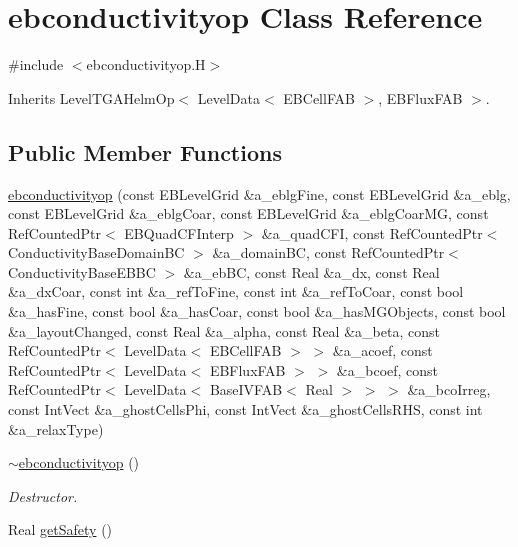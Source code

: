 \hypertarget{classebconductivityop}{}\section{ebconductivityop Class Reference}
\label{classebconductivityop}


{\ttfamily \#include $<$ebconductivityop.\+H$>$}



Inherits Level\+T\+G\+A\+Helm\+Op$<$ Level\+Data$<$ E\+B\+Cell\+F\+A\+B $>$, E\+B\+Flux\+F\+A\+B $>$.

\subsection*{Public Member Functions}
\begin{DoxyCompactItemize}
\item 
\hyperlink{classebconductivityop_a50a0d77b64d8a917c4fd860137751110}{ebconductivityop} (const E\+B\+Level\+Grid \&a\+\_\+eblg\+Fine, const E\+B\+Level\+Grid \&a\+\_\+eblg, const E\+B\+Level\+Grid \&a\+\_\+eblg\+Coar, const E\+B\+Level\+Grid \&a\+\_\+eblg\+Coar\+MG, const Ref\+Counted\+Ptr$<$ E\+B\+Quad\+C\+F\+Interp $>$ \&a\+\_\+quad\+C\+FI, const Ref\+Counted\+Ptr$<$ Conductivity\+Base\+Domain\+BC $>$ \&a\+\_\+domain\+BC, const Ref\+Counted\+Ptr$<$ Conductivity\+Base\+E\+B\+BC $>$ \&a\+\_\+eb\+BC, const Real \&a\+\_\+dx, const Real \&a\+\_\+dx\+Coar, const int \&a\+\_\+ref\+To\+Fine, const int \&a\+\_\+ref\+To\+Coar, const bool \&a\+\_\+has\+Fine, const bool \&a\+\_\+has\+Coar, const bool \&a\+\_\+has\+M\+G\+Objects, const bool \&a\+\_\+layout\+Changed, const Real \&a\+\_\+alpha, const Real \&a\+\_\+beta, const Ref\+Counted\+Ptr$<$ Level\+Data$<$ E\+B\+Cell\+F\+AB $>$ $>$ \&a\+\_\+acoef, const Ref\+Counted\+Ptr$<$ Level\+Data$<$ E\+B\+Flux\+F\+AB $>$ $>$ \&a\+\_\+bcoef, const Ref\+Counted\+Ptr$<$ Level\+Data$<$ Base\+I\+V\+F\+AB$<$ Real $>$ $>$ $>$ \&a\+\_\+bco\+Irreg, const Int\+Vect \&a\+\_\+ghost\+Cells\+Phi, const Int\+Vect \&a\+\_\+ghost\+Cells\+R\+HS, const int \&a\+\_\+relax\+Type)
\item 
\hyperlink{classebconductivityop_a8a835519aa250dab353923e491da1c4c}{$\sim$ebconductivityop} ()
\begin{DoxyCompactList}\small\item\em Destructor. \end{DoxyCompactList}\item 
Real \hyperlink{classebconductivityop_a9d02e0496dfa67d1554edd00f8d2d098}{get\+Safety} ()

\end{DoxyCompactItemize}
